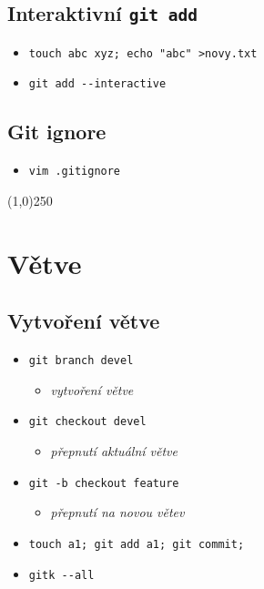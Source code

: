 \documentclass[10pt,twocolumn]{article}
\begin{document}
\subsection{Interaktivní \texttt{git add}}

\begin{itemize}
  \item \texttt{touch abc xyz; echo "abc" >novy.txt}
  \item \texttt{git add {-}{-}interactive}
\end{itemize}

\subsection{Git ignore}

\begin{itemize}
  \item \texttt{vim .gitignore}
\end{itemize}

\begin{center}\line(1,0){250}\end{center}

\section{Větve}
\subsection{Vytvoření větve}

\begin{itemize}
  \item \texttt{git branch devel}
  \begin{itemize} \item \textit{vytvoření větve} \end{itemize}
  \item \texttt{git checkout devel}
  \begin{itemize} \item \textit{přepnutí aktuální větve} \end{itemize}
  \item \texttt{git -b checkout feature}
  \begin{itemize} \item \textit{přepnutí na novou větev} \end{itemize}
  \item \texttt{touch a1; git add a1; git commit;}
  \item \texttt{gitk {-}{-}all}
\end{itemize}
\end{document}
